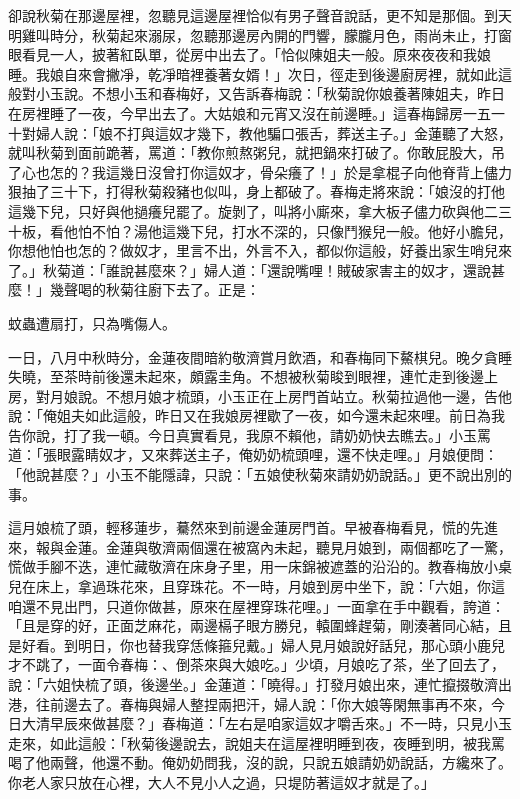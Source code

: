卻說秋菊在那邊屋裡，忽聽見這邊屋裡恰似有男子聲音說話，更不知是那個。到天明雞叫時分，秋菊起來溺尿，忽聽那邊房內開的門響，朦朧月色，雨尚未止，打窗眼看見一人，披著紅臥單，從房中出去了。「恰似陳姐夫一般。原來夜夜和我娘睡。我娘自來會撇凈，乾凈暗裡養著女婿！」次日，徑走到後邊廚房裡，就如此這般對小玉說。不想小玉和春梅好，又告訴春梅說：「秋菊說你娘養著陳姐夫，昨日在房裡睡了一夜，今早出去了。大姑娘和元宵又沒在前邊睡。」這春梅歸房一五一十對婦人說：「娘不打與這奴才幾下，教他騙口張舌，葬送主子。」金蓮聽了大怒，就叫秋菊到面前跪著，罵道：「教你煎熬粥兒，就把鍋來打破了。你敢屁股大，吊了心也怎的？我這幾日沒曾打你這奴才，骨朵癢了！」於是拿棍子向他脊背上儘力狠抽了三十下，打得秋菊殺豬也似叫，身上都破了。春梅走將來說：「娘沒的打他這幾下兒，只好與他撾癢兒罷了。旋剝了，叫將小廝來，拿大板子儘力砍與他二三十板，看他怕不怕？湯他這幾下兒，打水不深的，只像鬥猴兒一般。他好小膽兒，你想他怕也怎的？做奴才，里言不出，外言不入，都似你這般，好養出家生哨兒來了。」秋菊道：「誰說甚麼來？」婦人道：「還說嘴哩！賊破家害主的奴才，還說甚麼！」幾聲喝的秋菊往廚下去了。正是：

蚊蟲遭扇打，只為嘴傷人。

一日，八月中秋時分，金蓮夜間暗約敬濟賞月飲酒，和春梅同下鰲棋兒。晚夕貪睡失曉，至茶時前後還未起來，頗露圭角。不想被秋菊睃到眼裡，連忙走到後邊上房，對月娘說。不想月娘才梳頭，小玉正在上房門首站立。秋菊拉過他一邊，告他說：「俺姐夫如此這般，昨日又在我娘房裡歇了一夜，如今還未起來哩。前日為我告你說，打了我一頓。今日真實看見，我原不賴他，請奶奶快去瞧去。」小玉罵道：「張眼露睛奴才，又來葬送主子，俺奶奶梳頭哩，還不快走哩。」月娘便問： 「他說甚麼？」小玉不能隱諱，只說：「五娘使秋菊來請奶奶說話。」更不說出別的事。

這月娘梳了頭，輕移蓮步，驀然來到前邊金蓮房門首。早被春梅看見，慌的先進來，報與金蓮。金蓮與敬濟兩個還在被窩內未起，聽見月娘到，兩個都吃了一驚，慌做手腳不迭，連忙藏敬濟在床身子里，用一床錦被遮蓋的沿沿的。教春梅放小桌兒在床上，拿過珠花來，且穿珠花。不一時，月娘到房中坐下，說：「六姐，你這咱還不見出門，只道你做甚，原來在屋裡穿珠花哩。」一面拿在手中觀看，誇道：「且是穿的好，正面芝麻花，兩邊槅子眼方勝兒，轅圍蜂趕菊，剛湊著同心結，且是好看。到明日，你也替我穿恁條箍兒戴。」婦人見月娘說好話兒，那心頭小鹿兒才不跳了，一面令春梅：、倒茶來與大娘吃。」少頃，月娘吃了茶，坐了回去了，說：「六姐快梳了頭，後邊坐。」金蓮道：「曉得。」打發月娘出來，連忙攛掇敬濟出港，往前邊去了。春梅與婦人整捏兩把汗，婦人說：「你大娘等閑無事再不來，今日大清早辰來做甚麼？」春梅道：「左右是咱家這奴才嚼舌來。」不一時，只見小玉走來，如此這般：「秋菊後邊說去，說姐夫在這屋裡明睡到夜，夜睡到明，被我罵喝了他兩聲，他還不動。俺奶奶問我，沒的說，只說五娘請奶奶說話，方纔來了。你老人家只放在心裡，大人不見小人之過，只堤防著這奴才就是了。」

